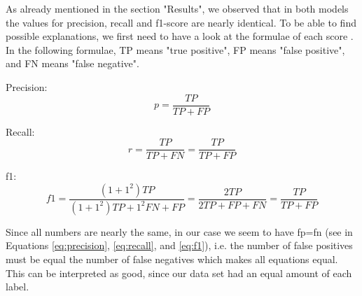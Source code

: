 \documentclass[sigconf,screen]{acmart}
\begin{document}
As already mentioned in the section "Results", we observed that in both models the values for precision, recall and f1-score are nearly identical. To be able to find possible explanations, we first need to have a look at the formulae of each score \cite{scoreExplanation}. In the following formulae, TP means "true positive", FP means "false positive", and FN means "false negative".

Precision:
\begin{equation}
	p = \frac{TP}{TP+FP}
	\label{eq:precision}
\end{equation}

Recall:
\begin{equation}
	r = \frac{TP}{TP+FN} = \frac{TP}{TP+FP}
	\label{eq:recall}
\end{equation}

f1:
\begin{equation}
	f1 = \frac{(1+1^2)TP}{(1+1^2)TP +1^2 FN+FP} = \frac{2TP}{2TP+FP+FN} = \frac{TP}{TP+FP}
	\label{eq:f1}
\end{equation}

Since all numbers are nearly the same, in our case we seem to have fp=fn (see in Equations \ref{eq:precision}, \ref{eq:recall}, and \ref{eq:f1}), i.e. the number of false positives must be equal the number of false negatives which makes all equations equal. This can be interpreted as good, since our data set had an equal amount of each label.





\appendix
\end{document}
